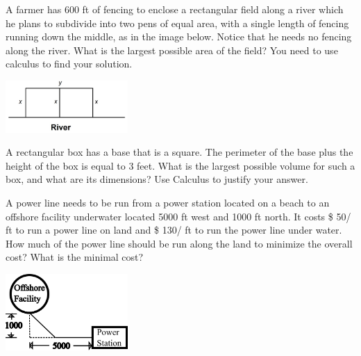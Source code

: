 \documentclass[11pt, addpoints]{exam}
\begin{document}
\begin{questions}
\pagebreak


\question A farmer has 600 ft of fencing to enclose a rectangular field along a river which he plans to subdivide into two pens of equal area, with a single length of fencing running down the middle, as in the image below. Notice that he needs no fencing along the river. What is the largest possible area of the field? You need to use calculus to find your solution.
\begin{center}
\includegraphics[width=0.35\textwidth]{Images/F23M241MT2MUpic1.jpg}
\end{center}

\pagebreak

\question A rectangular box has a base that is a square. The perimeter of the base plus the height of the box is equal to 3 feet. What is the largest possible volume for such a box, and what are its dimensions? Use Calculus to justify your answer.
\pagebreak


\question A power line needs to be run from a power station located on a beach to an offshore facility underwater located 5000 ft west and 1000 ft north. It costs \$ 50/ ft to run a power line on land and \$ 130/ ft to run the power line under water. How much of the power line should be run along the land to minimize the overall cost? What is the minimal cost?

\begin{center}
    \includegraphics[width=0.35\textwidth]{Images/PMT2drawing.png}
\end{center}

\pagebreak


\question 
\addpoints
\begin{parts}

\end{parts}
\end{questions}
\end{document}
